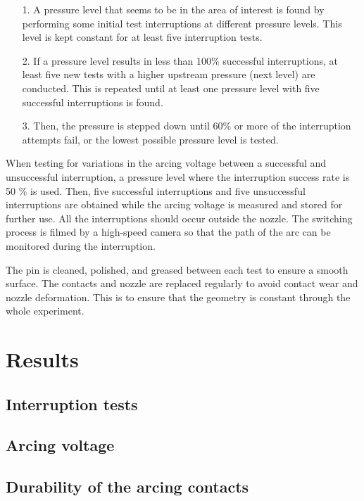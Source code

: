 \documentclass[10pt,b5paper,twoside]{article}
\begin{document}
\begin{itemize}
\item[1.] A pressure level that seems to be in the area of interest is found by performing some initial test interruptions at different pressure levels. This level is kept constant for at least five interruption tests.
\item[2.] If a pressure level results in less than 100\% successful interruptions, at least five new tests with a higher upstream pressure (next level) are conducted. This is repeated until at least one pressure level with five successful interruptions is found.
\item[3.] Then, the pressure is stepped down until 60\% or more of the interruption attempts fail, or the lowest possible pressure level is tested.
\end{itemize}

When testing for variations in the arcing voltage between a successful and unsuccessful interruption, a pressure level where the interruption success rate is 50 \% is used. Then, five successful interruptions and five unsuccessful interruptions are obtained while the arcing voltage is measured and stored for further use. All the interruptions should occur outside the nozzle. The switching process is filmed by a high-speed camera so that the path of the arc can be monitored during the interruption.

The pin is cleaned, polished, and greased between each test to ensure a smooth surface. The contacts and nozzle are replaced regularly to avoid contact wear and nozzle deformation. This is to ensure that the geometry is constant through the whole experiment.
\cleardoublepage

\section{Results}
\subsection{Interruption tests} 


\newpage
\subsection{Arcing voltage}


\newpage
\subsection{Durability of the arcing contacts} \label{sec:durability}
\end{document}
